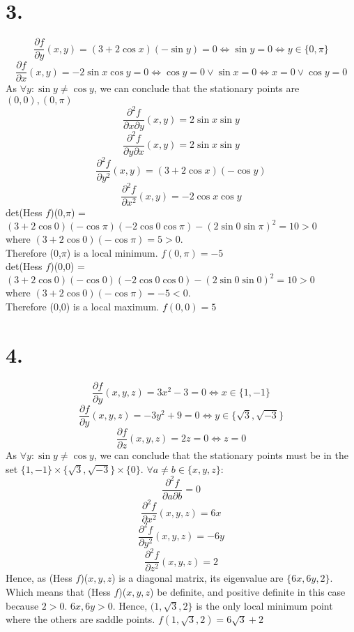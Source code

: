 \documentclass[11pt]{article}
\begin{document}
\section*{3.}
\[
\frac{\partial f}{\partial y}(x,y) = (3+2\cos x)(-\sin y) = 0 \iff \sin y = 0 \iff y \in \{0, \pi \}
\]
\[
\frac{\partial f}{\partial x}(x,y) = -2 \sin x \cos y = 0 \iff \cos y = 0 \lor \sin x = 0 \iff x = 0 \lor \cos y = 0\]
As $\forall y: \sin y \ne \cos y$, we can conclude that the stationary points are $(0,0), (0,\pi)$
\[
\frac{\partial^2 f}{\partial x \partial y}(x,y) = 2\sin x\sin y 
\]
\[
\frac{\partial^2 f}{\partial y \partial x}(x,y) = 2\sin x \sin y 
\]
\[
\frac{\partial^2 f}{\partial y^2}(x,y) = (3+2\cos x)(-\cos y) 
\]
\[
\frac{\partial^2 f}{\partial x^2}(x,y) = -2\cos x\cos y
\]
det(Hess $f$)(0,$\pi$) = $(3+2\cos 0)(-\cos \pi)(-2\cos 0\cos \pi)-(2\sin 0 \sin \pi)^2 = 10 > 0$ \\
where $(3+2\cos 0)(-\cos \pi)= 5 > 0$. \\
Therefore (0,$\pi$) is a local minimum.
$f(0,\pi) = -5$ \\
det(Hess $f$)(0,0) = $(3+2\cos 0)(-\cos 0)(-2\cos 0\cos 0)-(2\sin 0 \sin 0)^2 = 10 > 0$ \\
where $(3+2\cos 0)(-\cos \pi)= -5 < 0$. \\
Therefore (0,0) is a local maximum. $f(0,0) = 5$ 
\pagebreak
\section*{4.}
\[
\frac{\partial f}{\partial y}(x,y,z) = 3x^2 - 3 = 0 \iff x \in \{1,-1\}
\]
\[
\frac{\partial f}{\partial y}(x,y,z) = -3y^2 + 9 = 0\iff y \in \{\sqrt{3}, \sqrt{-3}\} 
\]
\[
\frac{\partial f}{\partial z}(x,y,z) = 2z = 0 \iff z = 0 
\]
As $\forall y: \sin y \ne \cos y$, we can conclude that the stationary points must be in the set $\{1,-1\} \times \{\sqrt{3}, \sqrt{-3}\} \times \{0\}$.
$\forall a \ne b \in \{x,y,z\}:$
\[
\frac{\partial^2 f}{\partial a \partial b} = 0 
\]
\[
\frac{\partial^2 f}{\partial x^2}(x,y,z) = 6x
\]
\[
\frac{\partial^2 f}{\partial y^2}(x,y,z) = -6y
\]
\[
\frac{\partial^2 f}{\partial z^2}(x,y,z) = 2
\]
Hence, as (Hess $f$)($x,y,z$) is a diagonal matrix, its eigenvalue are $\{6x, 6y, 2\}$. Which means that (Hess $f$)($x,y,z$) be definite, and positive definite in this case because $2 > 0$. $6x,6y > 0$. Hence, $(1,\sqrt{3},2\}$ is the only local minimum point where the others are saddle points. $f(1,\sqrt{3},2) = 6\sqrt{3} + 2$
\pagebreak
\end{document}
